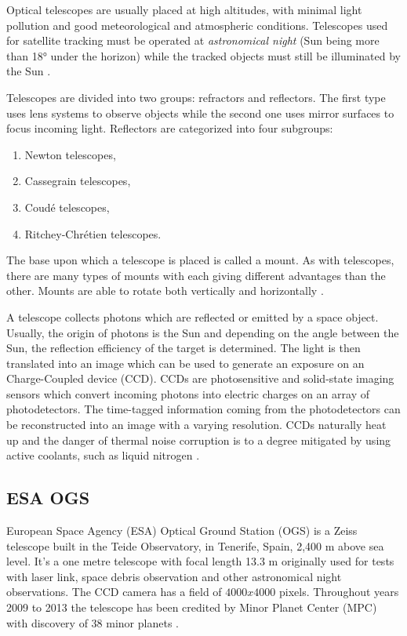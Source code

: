 Optical telescopes are usually placed at high altitudes, with minimal light pollution and good meteorological and atmospheric conditions. Telescopes used for satellite tracking must be operated at \emph{astronomical night} (Sun being more than 18° under the horizon) while the tracked objects must still be illuminated by the Sun \citep{klinkrad2006space}.

	Telescopes are divided into two groups: refractors and reflectors. The first type uses lens systems to observe objects while the second one uses mirror surfaces to focus incoming light. Reflectors are categorized into four subgroups:
	
\begin{enumerate}
	\item Newton telescopes,
	\item Cassegrain telescopes,
	\item Coudé telescopes,
	\item Ritchey-Chrétien telescopes.
\end{enumerate}
	
	The base upon which a telescope is placed is called a mount. As with telescopes, there are many types of mounts with each giving different advantages than the other. Mounts are able to rotate both vertically and horizontally \citep{klinkrad2006space}.
	
	A telescope collects photons which are reflected or emitted by a space object. Usually, the origin of photons is the Sun and depending on the angle between the Sun, the reflection efficiency of the target is determined. The light is then translated into an image which can be used to generate an exposure on an Charge-Coupled device (CCD). CCDs are photosensitive and solid-state imaging sensors which convert incoming photons into electric charges on an array of photodetectors. The time-tagged information coming from the photodetectors can be reconstructed into an image with a varying resolution. CCDs naturally heat up and the danger of thermal noise corruption is to a degree mitigated by using active coolants, such as liquid nitrogen \citep{klinkrad2006space}.

\subsection{ESA OGS}\label{subsec:esa_ogs}
European Space Agency (ESA) Optical Ground Station (OGS) is a Zeiss telescope built in the Teide Observatory, in Tenerife, Spain, 2,400 m above sea level. It's a one metre telescope with focal length 13.3 m originally used for tests with laser link, space debris observation and other astronomical night observations. The CCD camera has a field of $4000 x 4000$ pixels. Throughout years 2009 to 2013 the telescope has been credited by Minor Planet Center (MPC) with discovery of 38 minor planets \citep{esaogs}.

